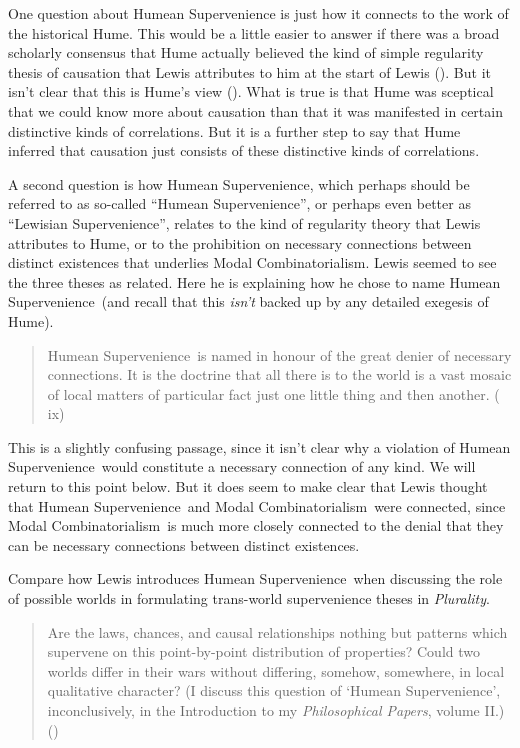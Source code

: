 \documentclass[
  10pt,
  letterpaper,
  DIV=11,
  numbers=noendperiod,
  twoside]{scrartcl}
\begin{document}
One question about Humean Supervenience is just how it connects to the
work of the historical Hume. This would be a little easier to answer if
there was a broad scholarly consensus that Hume actually believed the
kind of simple regularity thesis of causation that Lewis attributes to
him at the start of Lewis (). But it
isn't clear that this is Hume's view
(). What is true is that Hume
was sceptical that we could know more about causation than that it was
manifested in certain distinctive kinds of correlations. But it is a
further step to say that Hume inferred that causation just consists of
these distinctive kinds of correlations.

A second question is how Humean Supervenience, which perhaps should be
referred to as so-called ``Humean Supervenience'', or perhaps even
better as ``Lewisian Supervenience'', relates to the kind of regularity
theory that Lewis attributes to Hume, or to the prohibition on necessary
connections between distinct existences that underlies Modal
Combinatorialism. Lewis seemed to see the three theses as related. Here
he is explaining how he chose to name Humean Supervenience~(and recall
that this \emph{isn't} backed up by any detailed exegesis of Hume).

\begin{quote}
Humean Supervenience~is named in honour of the great denier of necessary
connections. It is the doctrine that all there is to the world is a vast
mosaic of local matters of particular fact just one little thing and
then another. ( ix)
\end{quote}

This is a slightly confusing passage, since it isn't clear why a
violation of Humean Supervenience~would constitute a necessary
connection of any kind. We will return to this point below. But it does
seem to make clear that Lewis thought that Humean Supervenience~and
Modal Combinatorialism~were connected, since Modal Combinatorialism~is
much more closely connected to the denial that they can be necessary
connections between distinct existences.

Compare how Lewis introduces Humean Supervenience~when discussing the
role of possible worlds in formulating trans-world supervenience theses
in \emph{Plurality}.

\begin{quote}
Are the laws, chances, and causal relationships nothing but patterns
which supervene on this point-by-point distribution of properties? Could
two worlds differ in their wars without differing, somehow, somewhere,
in local qualitative character? (I discuss this question of `Humean
Supervenience', inconclusively, in the Introduction to my
\emph{Philosophical Papers}, volume II.)
()
\end{quote}
\end{document}
